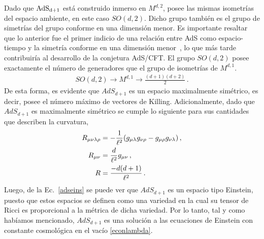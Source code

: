 \documentclass[../Main.tex]{subfiles}
\begin{document}
Dado que $\rm AdS_{d+1}$ está construido inmerso en $M^{d,2}$, posee las mismas isometrías del espacio ambiente, en este caso $SO(d,2)$. Dicho grupo también es el grupo de simetrías del grupo conforme en una dimensión menor. Es importante resaltar que lo anterior fue el primer indicio de una relación entre AdS como espacio-tiempo y la simetría conforme en una dimensión menor~\cite{Brown:1986nw}, lo que más tarde contribuiría al desarrollo de la conjetura AdS/CFT. El grupo $SO(d,2)$ posee exactamente el número de generadores que el grupo de isometrías de $M^{d,1}$.
\begin{align}
    SO(d,2)\to M^{d,1}\to \frac{(d+1)(d+2)}{2}\, .
\end{align}
De esta forma, es evidente que $AdS_{d+1}$ es un espacio maximalmente simétrico, es decir, posee el número máximo de vectores de Killing. Adicionalmente, dado que $AdS_{d+1}$ es maximalmente simétrico se cumple lo siguiente para sus cantidades que describen la curvatura,
\begin{align}\notag
R_{\mu\nu\lambda\rho}&=-\frac{1}{\ell^2}(g_{\mu\lambda}g_{\nu\rho}-g_{\mu\rho}g_{\nu\lambda}) \, ,\\
R_{\mu\nu}&=\frac{d}{\ell^2}g_{\mu\nu}\, ,\label{adseins}\\ \notag
R&=\frac{-d(d+1)}{\ell^2} \, . 
\end{align}
Luego, de la Ec.~\eqref{adseins} se puede ver que $AdS_{d+1}$ es un espacio tipo Einstein, puesto que estos espacios se definen como una variedad en la cual su tensor de Ricci es proporcional a la métrica de dicha variedad. Por lo tanto, tal y como habíamos mencionado, $AdS_{d+1}$ es una solución a las ecuaciones de Einstein con constante cosmológica en el vacío \eqref{econlambda}.
\end{document}
